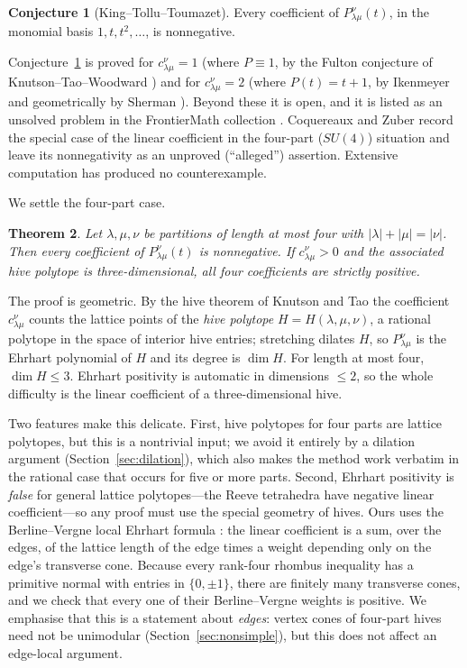 \documentclass[11pt]{amsart}
\newtheorem{theorem}{Theorem}
\theoremstyle{definition}
\newtheorem{conjecture}[theorem]{Conjecture}
\newcommand{\lam}{\lambda}
\begin{document}
\begin{conjecture}[King--Tollu--Toumazet]\label{conj:ktt}
Every coefficient of $P^{\nu}_{\lam\mu}(t)$, in the monomial basis
$1,t,t^2,\dots$, is nonnegative.
\end{conjecture}

Conjecture~\ref{conj:ktt} is proved for $c^{\nu}_{\lam\mu}=1$
(where $P\equiv 1$, by the Fulton conjecture of Knutson--Tao--Woodward
\cite{KTW}) and for $c^{\nu}_{\lam\mu}=2$ (where $P(t)=t+1$, by Ikenmeyer
\cite{Ikenmeyer} and geometrically by Sherman \cite{Sherman}). Beyond these it
is open, and it is listed as an unsolved problem in the FrontierMath collection
\cite{FrontierMath}. Coquereaux and Zuber \cite{CoqZuber} record the special
case of the linear coefficient in the four-part ($SU(4)$) situation and leave
its nonnegativity as an unproved (``alleged'') assertion. Extensive computation
has produced no counterexample.

We settle the four-part case.

\begin{theorem}\label{thm:main}
Let $\lam,\mu,\nu$ be partitions of length at most four with
$|\lam|+|\mu|=|\nu|$. Then every coefficient of $P^{\nu}_{\lam\mu}(t)$ is
nonnegative. If $c^{\nu}_{\lam\mu}>0$ and the associated hive polytope is
three-dimensional, all four coefficients are strictly positive.
\end{theorem}

The proof is geometric. By the hive theorem of Knutson and Tao \cite{KnutsonTao}
the coefficient $c^{\nu}_{\lam\mu}$ counts the lattice points of the
\emph{hive polytope} $H=H(\lam,\mu,\nu)$, a rational polytope in the space of
interior hive entries; stretching dilates $H$, so $P^{\nu}_{\lam\mu}$ is the
Ehrhart polynomial of $H$ and its degree is $\dim H$. For length at most four,
$\dim H\le 3$. Ehrhart positivity is automatic in dimensions $\le 2$, so the
whole difficulty is the linear coefficient of a three-dimensional hive.

Two features make this delicate. First, hive polytopes for four parts are
lattice polytopes, but this is a nontrivial input; we avoid it entirely by a
dilation argument (Section~\ref{sec:dilation}), which also makes the method work
verbatim in the rational case that occurs for five or more parts. Second,
Ehrhart positivity is \emph{false} for general lattice polytopes---the Reeve
tetrahedra have negative linear coefficient---so any proof must use the special
geometry of hives. Ours uses the Berline--Vergne local Ehrhart formula
\cite{BerlineVergne,RingSchurmann}: the linear coefficient is a sum, over the
edges, of the lattice length of the edge times a weight depending only on the
edge's transverse cone. Because every rank-four rhombus inequality has a
primitive normal with entries in $\{0,\pm1\}$, there are finitely many
transverse cones, and we check that every one of their Berline--Vergne weights
is positive. We emphasise that this is a statement about \emph{edges}: vertex
cones of four-part hives need not be unimodular (Section~\ref{sec:nonsimple}),
but this does not affect an edge-local argument.
\end{document}

